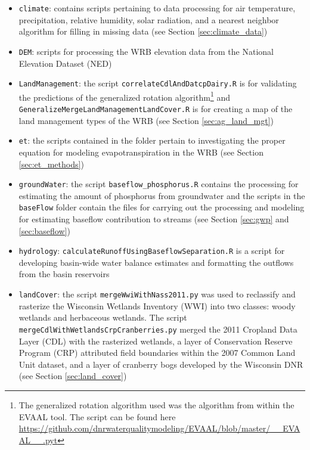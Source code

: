 \begin{itemize}
\item \texttt{climate}: contains scripts pertaining to data processing for air temperature, precipitation, relative humidity, solar radiation, and a nearest neighbor algorithm for filling in missing data (see Section \ref{sec:climate_data})

\item \texttt{DEM}: scripts for processing the WRB elevation data from the National Elevation Dataset (NED)

\item \texttt{LandManagement}: the script \texttt{correlateCdlAndDatcpDairy.R} is for validating the predictions of the generalized rotation algorithm\footnote{The generalized rotation algorithm used was the algorithm from within the EVAAL tool. The script can be found here \url{https://github.com/dnrwaterqualitymodeling/EVAAL/blob/master/__EVAAL__.pyt}} and \texttt{GeneralizeMergeLandManagementLandCover.R} is for creating a map of the land management types of the WRB (see Section \ref{sec:ag_land_mgt})

\item \texttt{et}: the scripts contained in the folder pertain to investigating the proper equation for modeling evapotranspiration in the WRB (see Section \ref{sec:et_methods})

\item \texttt{groundWater}: the script \texttt{baseflow\_phosphorus.R} contains the processing for estimating the amount of phosphorus from groundwater and the scripts in the \texttt{baseFlow} folder contain the files for carrying out the processing and modeling for estimating baseflow contribution to streams (see Section \ref{sec:gwp} and \ref{sec:baseflow})

\item \texttt{hydrology}: \texttt{calculateRunoffUsingBaseflowSeparation.R} is a script for developing  basin-wide water balance estimates and formatting the outflows from the basin reservoirs

\item \texttt{landCover}: the script \texttt{mergeWwiWithNass2011.py} was used to reclassify and rasterize the Wisconsin Wetlands Inventory (WWI) into two classes: woody wetlands and herbaceous wetlands. The script \texttt{mergeCdlWithWetlandsCrpCranberries.py} merged the 2011 Cropland Data Layer (CDL) with the rasterized wetlands, a layer of Conservation Reserve Program (CRP) attributed field boundaries within the 2007 Common Land Unit dataset, and a layer of cranberry bogs developed by the Wisconsin DNR (see Section \ref{sec:land_cover})


\end{itemize}
